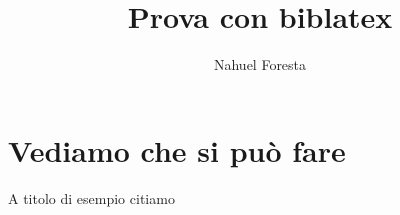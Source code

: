 \documentclass[a4paper,10pt]{article}
\title{Prova con biblatex}
\author{Nahuel Foresta}
\begin{document}
\maketitle

\newpage

\section{Vediamo che si può fare}
A titolo di esempio citiamo \cite{Nahuel19}

\vspace{5cm}


\printbibliography
\end{document}
